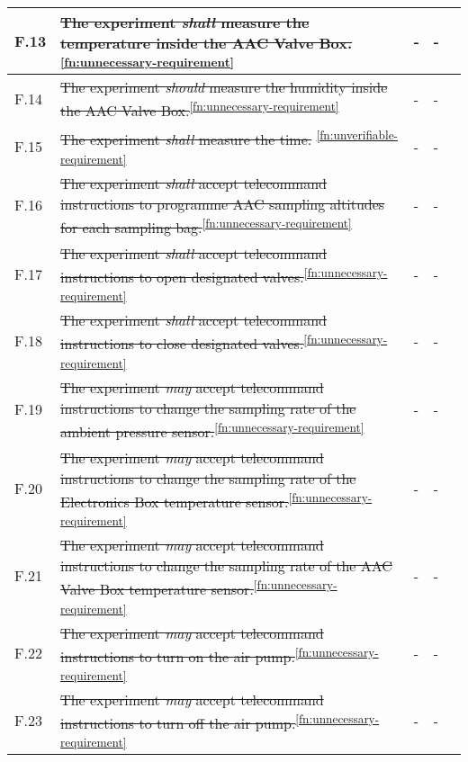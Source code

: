 \begin{longtable}[]{|m{}| m{} |m{} |m{}|m{}|}
F.13 & \st{The experiment \textit{shall} measure the temperature inside the AAC Valve Box.} \textsuperscript{\ref{fn:unnecessary-requirement}}&- & -& \\ \hline
F.14 & \st{The experiment \textit{should} measure the humidity inside the AAC Valve Box.}\textsuperscript{\ref{fn:unnecessary-requirement}} & -&- & \\ \hline
F.15 & \st{The experiment \textit{shall} measure the time.} \textsuperscript{\ref{fn:unverifiable-requirement}}&- &-&\\ \hline
F.16 & \st{The experiment \textit{shall} accept telecommand instructions to programme AAC sampling altitudes for each sampling bag.}\textsuperscript{\ref{fn:unnecessary-requirement}} &- &- &\\ \hline
F.17 & \st{The experiment \textit{shall} accept telecommand instructions to open designated valves.}\textsuperscript{\ref{fn:unnecessary-requirement}} &- &- & \\ \hline
F.18 & \st{The experiment \textit{shall} accept telecommand instructions to close designated valves.}\textsuperscript{\ref{fn:unnecessary-requirement}} &- &- & \\ \hline
F.19 & \st{The experiment \textit{may} accept telecommand instructions to change the sampling rate of the ambient pressure sensor.}\textsuperscript{\ref{fn:unnecessary-requirement}} &- &- & \\ \hline
F.20 & \st{The experiment \textit{may} accept telecommand instructions to change the sampling rate of the Electronics Box temperature sensor.}\textsuperscript{\ref{fn:unnecessary-requirement}} &- &- & \\ \hline
F.21 & \st{The experiment \textit{may} accept telecommand instructions to change the sampling rate of the AAC Valve Box temperature sensor.}\textsuperscript{\ref{fn:unnecessary-requirement}}& -&-&\\ \hline
F.22 & \st{The experiment \textit{may} accept telecommand instructions to turn on the air pump.}\textsuperscript{\ref{fn:unnecessary-requirement}}                                                                                              &      -        & -            &        \\ \hline
F.23 & \st{The experiment \textit{may} accept telecommand instructions to turn off the air pump.}\textsuperscript{\ref{fn:unnecessary-requirement}}                                                                                             &      -       & -            &        \\ \hline

\end{longtable}
